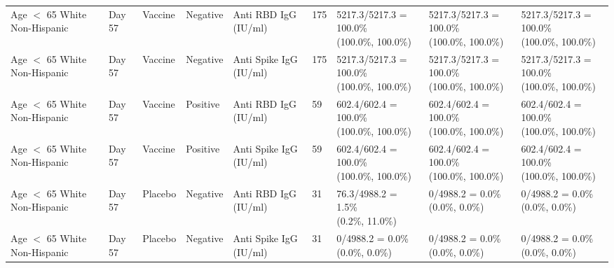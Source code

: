 \documentclass[]{book}
\theoremstyle{definition}
\theoremstyle{definition}
\theoremstyle{definition}
\newcommand{\1}{\mathbbm{1}}
\begin{document}
\begin{landscape}
\begin{ThreePartTable}
\begin{longtable}[t]{>{\raggedright\arraybackslash}p{2.7cm}llllllll}
\hspace{1em}Age $<$ 65 White Non-Hispanic & Day 57 & Vaccine & Negative & Anti RBD IgG (IU/ml) & 175 & \makecell[l]{5217.3/5217.3 = 100.0\%\\(100.0\%, 100.0\%)} & \makecell[l]{5217.3/5217.3 = 100.0\%\\(100.0\%, 100.0\%)} & \makecell[l]{5217.3/5217.3 = 100.0\%\\(100.0\%, 100.0\%)}\\
\hspace{1em}Age $<$ 65 White Non-Hispanic & Day 57 & Vaccine & Negative & Anti Spike IgG (IU/ml) & 175 & \makecell[l]{5217.3/5217.3 = 100.0\%\\(100.0\%, 100.0\%)} & \makecell[l]{5217.3/5217.3 = 100.0\%\\(100.0\%, 100.0\%)} & \makecell[l]{5217.3/5217.3 = 100.0\%\\(100.0\%, 100.0\%)}\\
\hspace{1em}Age $<$ 65 White Non-Hispanic & Day 57 & Vaccine & Positive & Anti RBD IgG (IU/ml) & 59 & \makecell[l]{602.4/602.4 = 100.0\%\\(100.0\%, 100.0\%)} & \makecell[l]{602.4/602.4 = 100.0\%\\(100.0\%, 100.0\%)} & \makecell[l]{602.4/602.4 = 100.0\%\\(100.0\%, 100.0\%)}\\
\hspace{1em}Age $<$ 65 White Non-Hispanic & Day 57 & Vaccine & Positive & Anti Spike IgG (IU/ml) & 59 & \makecell[l]{602.4/602.4 = 100.0\%\\(100.0\%, 100.0\%)} & \makecell[l]{602.4/602.4 = 100.0\%\\(100.0\%, 100.0\%)} & \makecell[l]{602.4/602.4 = 100.0\%\\(100.0\%, 100.0\%)}\\
\hspace{1em}Age $<$ 65 White Non-Hispanic & Day 57 & Placebo & Negative & Anti RBD IgG (IU/ml) & 31 & \makecell[l]{76.3/4988.2 = 1.5\%\\(0.2\%, 11.0\%)} & \makecell[l]{0/4988.2 = 0.0\%\\(0.0\%, 0.0\%)} & \makecell[l]{0/4988.2 = 0.0\%\\(0.0\%, 0.0\%)}\\
\hspace{1em}Age $<$ 65 White Non-Hispanic & Day 57 & Placebo & Negative & Anti Spike IgG (IU/ml) & 31 & \makecell[l]{0/4988.2 = 0.0\%\\(0.0\%, 0.0\%)} & \makecell[l]{0/4988.2 = 0.0\%\\(0.0\%, 0.0\%)} & \makecell[l]{0/4988.2 = 0.0\%\\(0.0\%, 0.0\%)}\\

\end{longtable}
\end{ThreePartTable}
\end{landscape}
\end{document}
